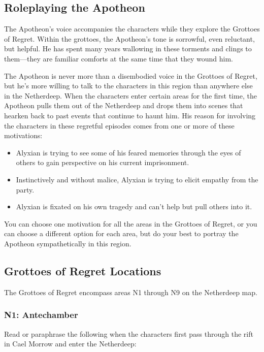 \documentclass[letterpaper, 11pt, bg=full, twocolumn]{dndbook}
\begin{document}
\subsection{Roleplaying the Apotheon}

The Apotheon's voice accompanies the characters while they explore the Grottoes of Regret. Within the grottoes, the Apotheon's tone is sorrowful, even reluctant, but helpful. He has spent many years wallowing in these torments and clings to them---they are familiar comforts at the same time that they wound him.

The Apotheon is never more than a disembodied voice in the Grottoes of Regret, but he's more willing to talk to the characters in this region than anywhere else in the Netherdeep. When the characters enter certain areas for the first time, the Apotheon pulls them out of the Netherdeep and drops them into scenes that hearken back to past events that continue to haunt him. His reason for involving the characters in these regretful episodes comes from one or more of these motivations:

\begin{itemize}
\item Alyxian is trying to see some of his feared memories through the eyes of others to gain perspective on his current imprisonment.
\item Instinctively and without malice, Alyxian is trying to elicit empathy from the party.
\item Alyxian is fixated on his own tragedy and can't help but pull others into it.
\end{itemize}

You can choose one motivation for all the areas in the Grottoes of Regret, or you can choose a different option for each area, but do your best to portray the Apotheon sympathetically in this region.

\subsection{Grottoes of Regret Locations}

The Grottoes of Regret encompass areas N1 through N9 on the Netherdeep map.

\subsubsection{N1: Antechamber}

Read or paraphrase the following when the characters first pass through the rift in Cael Morrow and enter the Netherdeep:
\end{document}
